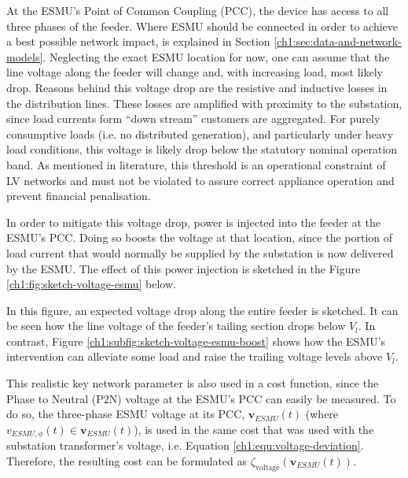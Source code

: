 At the ESMU's Point of Common Coupling (PCC), the device has access to all three phases of the feeder.
Where ESMU should be connected in order to achieve a best possible network impact, is explained in Section \ref{ch1:sec:data-and-network-models}.
Neglecting the exact ESMU location for now, one can assume that the line voltage along the feeder will change and, with increasing load, most likely drop.
Reasons behind this voltage drop are the resistive and inductive losses in the distribution lines.
These losses are amplified with proximity to the substation, since load currents form ``down stream'' customers are aggregated.
For purely consumptive loads (i.e. no distributed generation), and particularly under heavy load conditions, this voltage is likely drop below the statutory nominal operation band.
As mentioned in literature, this threshold is an operational constraint of LV networks and must not be violated to assure correct appliance operation and prevent financial penalisation.

In order to mitigate this voltage drop, power is injected into the feeder at the ESMU's PCC.
Doing so boosts the voltage at that location, since the portion of load current that would normally be supplied by the substation is now delivered by the ESMU.
The effect of this power injection is sketched in the Figure \ref{ch1:fig:sketch-voltage-esmu} below.




In this figure, an expected voltage drop along the entire feeder is sketched. 
It can be seen how the line voltage of the feeder's tailing section drops below $V_l$.
In contrast, Figure \ref{ch1:subfig:sketch-voltage-esmu-boost} shows how the ESMU's intervention can alleviate some load and raise the trailing voltage levels above $V_l$.

This realistic key network parameter is also used in a cost function, since the Phase to Neutral (P2N) voltage at the ESMU's PCC can easily be measured.
To do so, the three-phase ESMU voltage at its PCC, $\textbf{v}_{ESMU}(t)$ (where $v_{ESMU,\phi}(t) \in \textbf{v}_{ESMU}(t)$), is used in the same cost that was used with the substation transformer's voltage, i.e. Equation \ref{ch1:equ:voltage-deviation}.
Therefore, the resulting cost can be formulated as $\zeta_\text{voltage}(\textbf{v}_{ESMU}(t))$.


